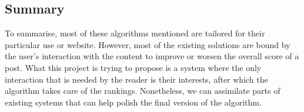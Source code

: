 \subsection{Summary}
To summarise, most of these algorithms mentioned are tailored for their particular use or website. However, most of the existing solutions are bound by the user's interaction with the content to improve or worsen the overall score of a post. What this project is trying to propose is a system where the only interaction that is needed by the reader is their interests, after which the algorithm takes care of the rankings. Nonetheless, we can assimilate parts of existing systems that can help polish the final version of the algorithm.
